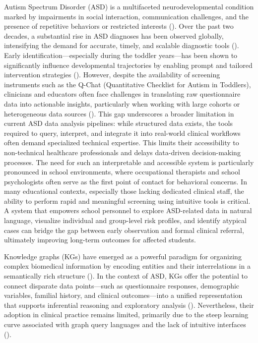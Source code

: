 \documentclass[pdflatex,sn-basic]{sn-jnl}%
\theoremstyle{thmstyleone}%
\theoremstyle{thmstyletwo}%
\theoremstyle{thmstylethree}%
\begin{document}
  Autism Spectrum Disorder (ASD) is a multifaceted neurodevelopmental condition marked by impairments in social interaction,
  communication challenges, and the presence of repetitive behaviors or restricted interests
  (\cite{newschaffer_epidemiology_2007, lord_autism_2018, hirota_autism_2023}). Over the past two decades, a substantial rise in
  ASD diagnoses has been observed globally, intensifying the demand for accurate, timely, and scalable diagnostic tools
  (\cite{salari_global_2022, santos_screening_2024, randall_diagnostic_2018}). Early identification—especially during the toddler
  years—has been shown to significantly influence developmental trajectories by enabling prompt and tailored intervention
  strategies (\cite{lord_autism_2000}). However, despite the availability of screening instruments such as the Q-Chat
  (Quantitative Checklist for Autism in Toddlers), clinicians and educators often face challenges in translating raw
  questionnaire data into actionable insights, particularly when working with large cohorts or heterogeneous data sources
  (\cite{allison_q-chat_2008,allison_quantitative_2021-1, allison_toward_2012}).
  This gap underscores a broader limitation in current ASD data analysis pipelines: while structured data exists, the tools
  required to query, interpret, and integrate it into real-world clinical workflows often demand specialized technical expertise.
  This limits their accessibility to non-technical healthcare professionals and delays data-driven decision-making processes.
  The need for such an interpretable and accessible system is particularly pronounced in school environments, where occupational
  therapists and school psychologists often serve as the first point of contact for behavioral concerns. In many educational
  contexts, especially those lacking dedicated clinical staff, the ability to perform rapid and meaningful screening using
  intuitive tools is critical. A system that empowers school personnel to explore ASD-related data in natural language, visualize
  individual and group-level risk profiles, and identify atypical cases can bridge the gap between early observation and formal
  clinical referral, ultimately improving long-term outcomes for affected students.

  Knowledge graphs (KGs) have emerged as a powerful paradigm for organizing complex biomedical information by encoding entities
  and their interrelations in a semantically rich structure (\cite{nicholson_constructing_2020}). In the context of ASD, KGs
  offer the potential to connect disparate data points—such as questionnaire responses, demographic variables, familial history,
  and clinical outcomes—into a unified representation that supports inferential reasoning and exploratory analysis
  (\cite{lu_machine_2024}). Nevertheless, their adoption in clinical practice remains limited, primarily due to the steep
  learning curve associated with graph query languages and the lack of intuitive interfaces (\cite{yang_comprehensive_2023}).
\end{document}
